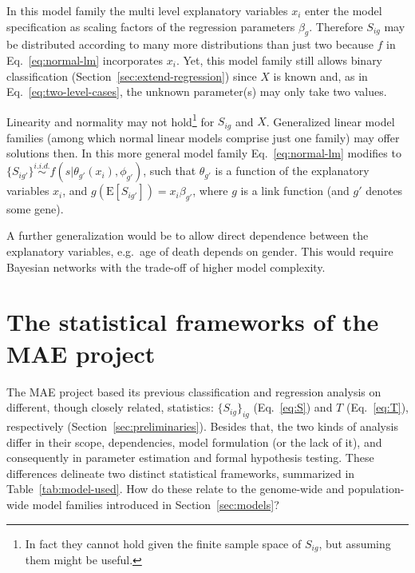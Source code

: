 \documentclass[letterpaper]{article}
\begin{document}
In this model family the multi level explanatory variables \(x_i\) enter the model specification as
scaling factors of the regression parameters \(\beta_g\).  Therefore \(S_{ig}\) may be distributed
according to many more distributions than just two because \(f\) in Eq.~\ref{eq:normal-lm}
incorporates \(x_i\).  Yet, this model family still allows binary
classification (Section~\ref{sec:extend-regression}) since \(X\) is known
and, as in Eq.~\ref{eq:two-level-cases}, the unknown parameter(s) may only take two values.

Linearity and normality may not hold\footnote{In fact they cannot hold given
the finite sample space of \(S_{ig}\), but assuming them
might be useful.} for \(S_{ig}\) and \(X\).  Generalized linear model
families (among which normal linear models comprise just one family) may offer solutions then.  In
this more general model family Eq.~\ref{eq:normal-lm} modifies to \(\{S_{ig'}\}
\overset{i.i.d.}{\sim} f(s | \theta_{g'}(x_i), \phi_{g'})\), such that \(\theta_{g'}\) is a function
of the explanatory variables \(x_i\), and \(g(\mathrm{E}[S_{ig'}]) = x_i \beta_{g'}\), where \(g\)
is a link function (and \(g'\) denotes some gene).

A further generalization would be to allow direct dependence between the
explanatory variables, e.g.~age of death depends on gender.  This would
require Bayesian networks with the trade-off of higher model complexity.

\section{The statistical frameworks of the MAE project}
\label{sec:stat-framework-mae-project}

The MAE project based its previous classification and regression analysis on
different, though closely related, statistics: \(\{S_{ig}\}_{ig}\)
(Eq.~\ref{eq:S}) and \(T\) (Eq.~\ref{eq:T}), respectively
(Section~\ref{sec:preliminaries}).  Besides that, the two kinds of analysis
differ in their scope, dependencies, model formulation (or the lack of it),
and consequently in parameter estimation and formal hypothesis testing.  These
differences delineate two distinct statistical frameworks, summarized in
Table~\ref{tab:model-used}.  How do these relate to the genome-wide
and population-wide model families introduced in Section~\ref{sec:models}?
\end{document}
